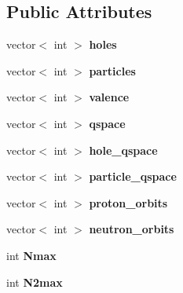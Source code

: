 \subsection*{Public Attributes}
\begin{DoxyCompactItemize}
\item 
\hypertarget{classModelSpace_a14bdabeefa614c27cd1cb04bd6c322b0}{vector$<$ int $>$ {\bfseries holes}}\label{classModelSpace_a14bdabeefa614c27cd1cb04bd6c322b0}

\item 
\hypertarget{classModelSpace_a71a4ecf5a421c9b388375abbae00023c}{vector$<$ int $>$ {\bfseries particles}}\label{classModelSpace_a71a4ecf5a421c9b388375abbae00023c}

\item 
\hypertarget{classModelSpace_a024b09899e55b396cb4fc7ea5c9d6249}{vector$<$ int $>$ {\bfseries valence}}\label{classModelSpace_a024b09899e55b396cb4fc7ea5c9d6249}

\item 
\hypertarget{classModelSpace_ae2fef3b74d96b3e519231fb5cc3c49ff}{vector$<$ int $>$ {\bfseries qspace}}\label{classModelSpace_ae2fef3b74d96b3e519231fb5cc3c49ff}

\item 
\hypertarget{classModelSpace_a691eab13c958b567ca51f7a199c347fe}{vector$<$ int $>$ {\bfseries hole\-\_\-qspace}}\label{classModelSpace_a691eab13c958b567ca51f7a199c347fe}

\item 
\hypertarget{classModelSpace_a7943dcd4466d03a0b267d60d0e143dc4}{vector$<$ int $>$ {\bfseries particle\-\_\-qspace}}\label{classModelSpace_a7943dcd4466d03a0b267d60d0e143dc4}

\item 
\hypertarget{classModelSpace_a7318082e80152f9d1743fd485c8616f4}{vector$<$ int $>$ {\bfseries proton\-\_\-orbits}}\label{classModelSpace_a7318082e80152f9d1743fd485c8616f4}

\item 
\hypertarget{classModelSpace_a9b21ad783317bff2e75cedef0300e89a}{vector$<$ int $>$ {\bfseries neutron\-\_\-orbits}}\label{classModelSpace_a9b21ad783317bff2e75cedef0300e89a}

\item 
\hypertarget{classModelSpace_aa049d819d4d18cfb466777581cc349d2}{int {\bfseries Nmax}}\label{classModelSpace_aa049d819d4d18cfb466777581cc349d2}

\item 
\hypertarget{classModelSpace_a60db71713d3964af214756163ba0585e}{int {\bfseries N2max}}\label{classModelSpace_a60db71713d3964af214756163ba0585e}


\end{DoxyCompactItemize}
